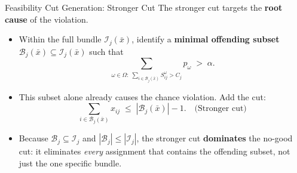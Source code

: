 \documentclass[aspectratio=169,11pt]{beamer}
\begin{document}
\begin{frame}[shrink=5]{Feasibility Cut Generation: Stronger Cut}
	The stronger cut targets the \textbf{root cause} of the violation.
	\begin{itemize}
		\item<1-> Within the full bundle $\mathcal{I}_j(\bar{x})$, identify a
			\textbf{minimal offending subset}
			$\mathcal{B}_j(\bar{x}) \subseteq \mathcal{I}_j(\bar{x})$ such that
			\[
				\sum_{\omega \in \Omega:\;
				\sum_{i \in \mathcal{B}_j(\bar{x})} S_{ij}^\omega > C_j}
				p_\omega \;>\; \alpha.
			\]
		\item<2-> This subset alone already causes the chance violation.
			Add the cut:
			\[
				\sum_{i \in \mathcal{B}_j(\bar{x})} x_{ij}
				\;\leq\; |\mathcal{B}_j(\bar{x})| - 1.
				\quad \text{(Stronger cut)}
			\]
		\item<3-> Because $\mathcal{B}_j \subseteq \mathcal{I}_j$
			and $|\mathcal{B}_j| \leq |\mathcal{I}_j|$, the stronger cut
			\textbf{dominates} the no-good cut: it eliminates
			\emph{every} assignment that contains the offending subset,
			not just the one specific bundle.
	\end{itemize}
\end{frame}
\end{document}
